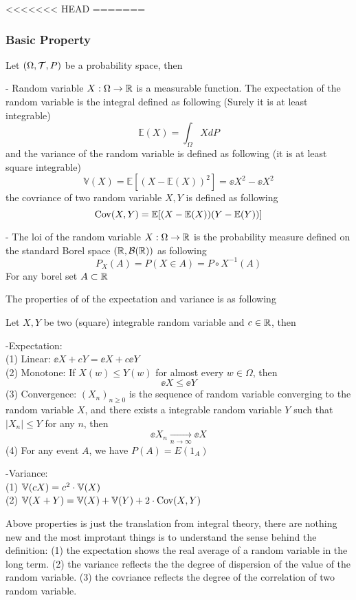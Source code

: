 \documentclass[en,geye,blue,normal,12pt,bibend=bibtex]{elegantnote}
\begin{document}
<<<<<<< HEAD
=======
\subsubsection{Basic Property}
\begin{definition}
    Let \((\Omega, \mathcal{T}, P)\) be a probability space, then

    - Random variable \(X: \Omega \to \mathbb{R}\) is a measurable function. The expectation of the random variable is the integral defined as following (Surely it is at least integrable)
    \[\mathbb{E}(X) = \int_{\Omega}XdP\]
    and the variance of the random variable is defined as following (it is at least square integrable)
    \[\mathbb{V}(X) = \mathbb{E}[(X-\mathbb{E}(X))^2] = \ee{X^2}-\ee{X}^2\]
    the covriance of two random variable \(X,Y\) is defined as following
    \[\mathrm{Cov}(X,Y) = \mathbb{E}[(X-\mathbb{E}(X))(Y-\mathbb{E}(Y))]\]

    - The loi of the random variable \(X: \Omega \to \mathbb{R}\) is the probability measure defined on the standard Borel space \((\mathbb{R}, \mathcal{B}(\mathbb{R}))\) as following
    \[P_X(A) = P(X \in A) = P\circ X^{-1}(A)\]
    For any borel set \(A \subset \mathbb{R}\)
\end{definition}

The properties of of the expectation and variance is as following

\begin{proposition}
    Let \(X,Y\) be two (square) integrable random variable and \(c \in \mathbb{R}\), then

    -Expectation:\\
    (1) Linear: \(\ee{X+cY} = \ee{X}+c\ee{Y}\)\\
    (2) Monotone: If \(X(w) \leq Y(w)\) for almost every \(w \in \Omega\), then
    \[\ee{X} \leq \ee{Y}\]
    (3) Convergence: \((X_n)_{n \geq 0}\) is the sequence of random variable converging to the random variable \(X\), and there exists a integrable random variable \(Y\) such that \(|X_n| \leq Y\) for any \(n\), then
    \[\ee{X_n} \xrightarrow[n \rightarrow \infty]{} \ee{X}\]
    (4) For any event \(A\), we have \(P(A) = E(1_A)\)

    -Variance: \\
    (1) \(\mathbb{V}(cX) = c^2 \cdot \mathbb{V}(X)\) \\
    (2) \(\mathbb{V}(X+Y) = \mathbb{V}(X)+\mathbb{V}(Y)+2\cdot\mathrm{Cov}(X,Y)\)
\end{proposition}

Above properties is just the translation from integral theory, there are nothing new and the most improtant things is to understand the sense behind the definition: (1) the expectation shows the real average of a random variable in the long term. (2) the variance reflects the the degree of dispersion of the value of the random variable. (3) the covriance reflects the degree of the correlation of two random variable.
\end{document}
